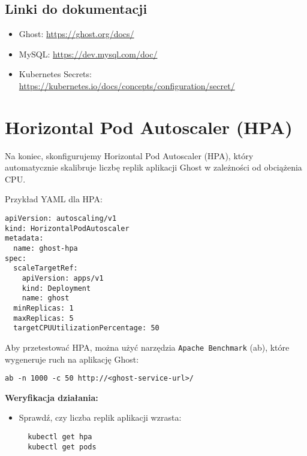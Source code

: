 \documentclass{article}
\begin{document}
\subsection{Linki do dokumentacji}
\begin{itemize}
  \item Ghost: \url{https://ghost.org/docs/}
  \item MySQL: \url{https://dev.mysql.com/doc/}
  \item Kubernetes Secrets: \url{https://kubernetes.io/docs/concepts/configuration/secret/}
\end{itemize}
\section{Horizontal Pod Autoscaler (HPA)}

Na koniec, skonfigurujemy Horizontal Pod Autoscaler (HPA), który automatycznie skalibruje liczbę replik aplikacji Ghost w zależności od obciążenia CPU.

Przykład YAML dla HPA:
\begin{lstlisting}
apiVersion: autoscaling/v1
kind: HorizontalPodAutoscaler
metadata:
  name: ghost-hpa
spec:
  scaleTargetRef:
    apiVersion: apps/v1
    kind: Deployment
    name: ghost
  minReplicas: 1
  maxReplicas: 5
  targetCPUUtilizationPercentage: 50
\end{lstlisting}

Aby przetestować HPA, można użyć narzędzia \texttt{Apache Benchmark} (ab), które wygeneruje ruch na aplikację Ghost:
\begin{lstlisting}
ab -n 1000 -c 50 http://<ghost-service-url>/
\end{lstlisting}

\textbf{Weryfikacja działania:}
\begin{itemize}
  \item Sprawdź, czy liczba replik aplikacji wzrasta:
  \begin{lstlisting}
  kubectl get hpa
  kubectl get pods
  \end{lstlisting}
\end{itemize}
\end{document}
